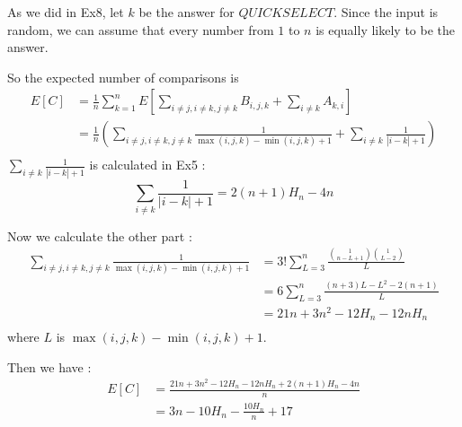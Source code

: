 As we did in Ex8, let $k$ be the answer for $QUICKSELECT$. Since the input is random, we can assume that every number from $1$ to $n$ is equally likely to be the answer.\par
So the expected number of comparisons is
\begin{align*}
	E[C] &= \frac{1}{n}\sum_{k=1}^{n}E[\sum_{i\neq j, i\neq k, j\neq k}B_{i,j,k}+\sum_{i\neq k}A_{k,i}]\\
	&= \frac{1}{n}(\sum_{i\neq j, i\neq k, j\neq k}\frac{1}{\max(i,j,k)-\min(i,j,k) + 1} + \sum_{i\neq k}\frac{1}{|i-k|+1})\\
\end{align*}
	$\sum_{i\neq k}\frac{1}{|i-k|+1}$ is calculated in Ex5 : $$\sum_{i\neq k}\frac{1}{|i-k|+1}=2(n+1)H_n-4n$$\par
	Now we calculate the other part :
\begin{align*}
	\sum_{i\neq j, i\neq k, j\neq k}\frac{1}{\max(i,j,k)-\min(i,j,k) + 1} &= 3!\sum_{L=3}^{n}\frac{\binom{1}{n-L+1}\binom{1}{L-2}}{L}\\
	&= 6\sum_{L=3}^{n}\frac{(n+3)L-L^2-2(n+1)}{L}\\
	&= 21n+3n^2-12H_n-12nH_n\\
\end{align*}
where $L$ is $\max(i,j,k)-\min(i,j,k)+1$.\par
Then we have :
\begin{align*}
		E[C] &= \frac{21n+3n^2-12H_n-12nH_n+2(n+1)H_n-4n}{n}\\
		&= 3n-10H_n-\frac{10H_n}{n}+17\\
\end{align*}

